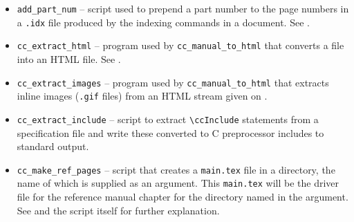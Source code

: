 \begin{itemize}
   \item \verb|add_part_num|%
         -- script used to prepend a part number to the 
         page numbers in a {\tt .idx} file produced by the indexing commands in
         a  document.  
         See .
   \item {} 
         \verb|cc_extract_html|%
          -- program used by {\tt cc\_manual\_to\_html}
         that converts a  file into an HTML file.
         See .
   \item \verb|cc_extract_images|%
         -- program used by {\tt cc\_manual\_to\_html}
         that extracts inline images
         ({\tt .gif} files) from an HTML stream given on .
   \item \verb|cc_extract_include|%
         -- script to extract \verb|\ccInclude|
         statements from a specification file and write these converted to
         C preprocessor includes to standard output.  
   \item \verb|cc_make_ref_pages|
         -- script that creates a%
                  {{\tt main.tex}}%
         file in a directory, the name of which is supplied as an argument.  
         This {\tt main.tex} will be the driver file for the reference manual 
         chapter for the directory named in the argument. See 
         and the script itself for further explanation.

\end{itemize}
